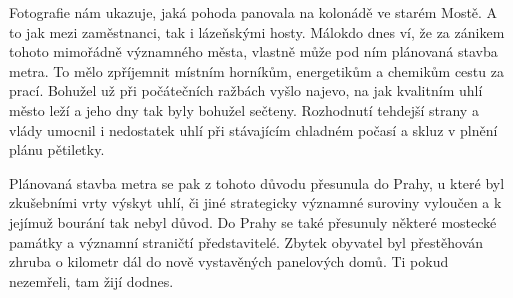 
Fotografie nám ukazuje, jaká pohoda panovala na kolonádě ve starém
Mostě. A to jak mezi zaměstnanci, tak i lázeňskými hosty. Málokdo dnes
ví, že za zánikem tohoto mimořádně významného města, vlastně může pod
ním plánovaná stavba metra. To mělo zpříjemnit místním horníkům,
energetikům a chemikům cestu za prací. Bohužel už při počátečních
ražbách vyšlo najevo, na jak kvalitním uhlí město leží a jeho dny tak
byly bohužel sečteny. Rozhodnutí tehdejší strany a vlády umocnil i
nedostatek uhlí při stávajícím chladném počasí a skluz v plnění plánu
pětiletky.

Plánovaná stavba metra se pak z tohoto důvodu přesunula do Prahy, u
které byl zkušebními vrty výskyt uhlí, či jiné strategicky významné
suroviny vyloučen a k jejímuž bourání tak nebyl důvod. Do Prahy se
také přesunuly některé mostecké památky a významní straničtí
představitelé. Zbytek obyvatel byl přestěhován zhruba o kilometr dál
do nově vystavěných panelových domů. Ti pokud nezemřeli, tam žijí
dodnes.
